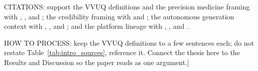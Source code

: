 CITATIONS: support the VVUQ definitions and the precision medicine
framing with \cite{sel2025vvuq}, \cite{zaid2025pbpk}, and
\cite{moradi2026twins}; the credibility framing with \cite{asmevv40} and
\cite{fda2023credibility}; the autonomous generation context with
\cite{trooskens2026compiled}, \cite{carlisle2026pipeline}, and
\cite{yan2026clinagent}; and the platform lineage with
\cite{kawchak2026sponsor}, \cite{kawchak2025qsppdac}, and
\cite{repo-cancer-automated}.

HOW TO PROCESS: keep the VVUQ definitions to a few sentences each; do not
restate Table~\ref{tab:intro_sources}, reference it. Connect the thesis
here to the Results and Discussion so the paper reads as one argument.]

